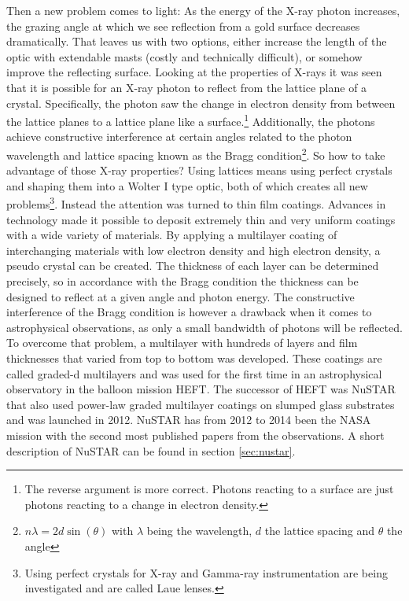 Then a new problem comes to light: As the energy of the X-ray photon increases, the grazing angle at which we see reflection from a gold surface decreases dramatically. That leaves us with two options, either increase the length of the optic with extendable masts (costly and technically difficult), or somehow improve the reflecting surface. Looking at the properties of X-rays it was seen that it is possible for an X-ray photon to reflect from the lattice plane of a crystal. Specifically, the photon saw the change in electron density from between the lattice planes to a lattice plane like a surface.\footnote{The reverse argument is more correct. Photons reacting to a surface are just photons reacting to a change in electron density.} Additionally, the photons achieve constructive interference at certain angles related to the photon wavelength and lattice spacing known as the Bragg condition\footnote{$n\lambda=2d\sin(\theta)$ with $\lambda$ being the wavelength, $d$ the lattice spacing and $\theta$ the angle}. So how to take advantage of those X-ray properties? Using lattices means using perfect crystals and shaping them into a Wolter I type optic, both of which creates all new problems\footnote{Using perfect crystals for X-ray and Gamma-ray instrumentation are being investigated and are called Laue lenses\cite{Lund:1992kc,Barriere:2014dj,Barriere:2009cm}.}. Instead the attention was turned to thin film coatings. Advances in technology made it possible to deposit extremely thin and very uniform coatings with a wide variety of materials. By applying a multilayer coating of interchanging materials with low electron density and high electron density, a pseudo crystal can be created. The thickness of each layer can be determined precisely, so in accordance with the Bragg condition the thickness can be designed to reflect at a given angle and photon energy. The constructive interference of the Bragg condition is however a drawback when it comes to astrophysical observations, as only a small bandwidth of photons will be reflected. To overcome that problem, a multilayer with hundreds of layers and film thicknesses that varied from top to bottom was developed. These coatings are called graded-d multilayers and was used for the first time in an astrophysical observatory in the balloon mission HEFT\cite{Koglin:2004tr,Madsen:2003te,Jensen:2002tf}. The successor of HEFT was NuSTAR\cite{Harrison:2013wl,Harrison:2010gu,Harrison:2005wa} that also used power-law graded multilayer coatings on slumped glass substrates\cite{Christensen:2011wg,Brejnholt2012} and was launched in 2012. NuSTAR has from 2012 to 2014 been the NASA mission with the second most published papers from the observations. A short description of NuSTAR can be found in section \ref{sec:nustar}.

